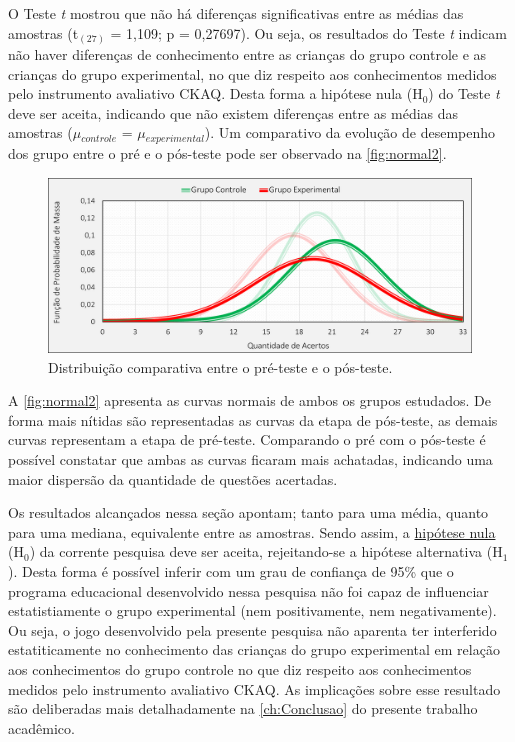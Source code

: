 O Teste \textit{t} mostrou que não há diferenças significativas entre as médias das amostras (t$_{(27)}$ = 1,109; p = 0,27697). Ou seja, os resultados do Teste \textit{t} indicam não haver diferenças de conhecimento entre as crianças do grupo controle e as crianças do grupo experimental, no que diz respeito aos conhecimentos medidos pelo instrumento avaliativo \ac{CKAQ}. Desta forma a hipótese nula (H$_0$) do Teste \textit{t} deve ser aceita, indicando que não existem diferenças entre as médias das amostras ($\mu$$_{controle}$ = $\mu$$_{experimental}$). %
Um comparativo da evolução de desempenho dos grupo entre o pré e o pós-teste pode ser observado na \autoref{fig:normal2}.

\begin{figure}[htb]
    \centering
    \caption{\label{fig:normal2}Distribuição comparativa entre o pré-teste e o pós-teste.}
    \includegraphics[width=\linewidth]{./Visuais/GraficosAntesDepois.pdf}
\end{figure}

A \autoref{fig:normal2} apresenta as curvas normais de ambos os grupos estudados. De forma mais nítidas são representadas as curvas da etapa de pós-teste, as demais curvas representam a etapa de pré-teste. Comparando o pré com o pós-teste é possível constatar que ambas as curvas ficaram mais achatadas, indicando uma maior dispersão da quantidade de questões acertadas. 

Os resultados alcançados nessa seção apontam; tanto para uma média, quanto para uma mediana, equivalente entre as amostras. Sendo assim, a \hyperref[hipotese]{hipótese nula} (H$_0$) da corrente pesquisa deve ser aceita, rejeitando-se a hipótese alternativa (H$_1$). Desta forma é possível inferir com um grau de confiança de 95\% que o programa educacional desenvolvido nessa pesquisa não foi capaz de influenciar estatistiamente o grupo experimental (nem positivamente, nem negativamente). Ou seja, o jogo desenvolvido pela presente pesquisa não aparenta ter interferido estatiticamente no conhecimento das crianças do grupo experimental em relação aos conhecimentos do grupo controle no que diz respeito aos conhecimentos medidos pelo instrumento avaliativo \ac{CKAQ}. As implicações sobre esse resultado são deliberadas mais detalhadamente na \autoref{ch:Conclusao} do presente trabalho acadêmico.

